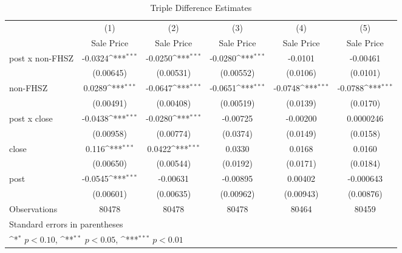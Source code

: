 \begin{table}[htbp]\centering
\def\sym#1{\ifmmode^{#1}\else\(^{#1}\)\fi}
\caption{Triple Difference Estimates\label{tabl}}
\begin{tabular}{l*{5}{c}}
\hline\hline
                    &\multicolumn{1}{c}{(1)}&\multicolumn{1}{c}{(2)}&\multicolumn{1}{c}{(3)}&\multicolumn{1}{c}{(4)}&\multicolumn{1}{c}{(5)}\\
                    &\multicolumn{1}{c}{Sale Price}&\multicolumn{1}{c}{Sale Price}&\multicolumn{1}{c}{Sale Price}&\multicolumn{1}{c}{Sale Price}&\multicolumn{1}{c}{Sale Price}\\
\hline
post x non-FHSZ     &     -0.0324\sym{***}&     -0.0250\sym{***}&     -0.0280\sym{***}&     -0.0101         &    -0.00461         \\
                    &   (0.00645)         &   (0.00531)         &   (0.00552)         &    (0.0106)         &    (0.0101)         \\
[1em]
non-FHSZ            &      0.0289\sym{***}&     -0.0647\sym{***}&     -0.0651\sym{***}&     -0.0748\sym{***}&     -0.0788\sym{***}\\
                    &   (0.00491)         &   (0.00408)         &   (0.00519)         &    (0.0139)         &    (0.0170)         \\
[1em]
post x close        &     -0.0438\sym{***}&     -0.0280\sym{***}&    -0.00725         &    -0.00200         &   0.0000246         \\
                    &   (0.00958)         &   (0.00774)         &    (0.0374)         &    (0.0149)         &    (0.0158)         \\
[1em]
close               &       0.116\sym{***}&      0.0422\sym{***}&      0.0330         &      0.0168         &      0.0160         \\
                    &   (0.00650)         &   (0.00544)         &    (0.0192)         &    (0.0171)         &    (0.0184)         \\
[1em]
post                &     -0.0545\sym{***}&    -0.00631         &    -0.00895         &     0.00402         &   -0.000643         \\
                    &   (0.00601)         &   (0.00635)         &   (0.00962)         &   (0.00943)         &   (0.00876)         \\
\hline
Observations        &       80478         &       80478         &       80478         &       80464         &       80459         \\
\hline\hline
\multicolumn{6}{l}{\footnotesize Standard errors in parentheses}\\
\multicolumn{6}{l}{\footnotesize \sym{*} \(p<0.10\), \sym{**} \(p<0.05\), \sym{***} \(p<0.01\)}\\
\end{tabular}
\end{table}
